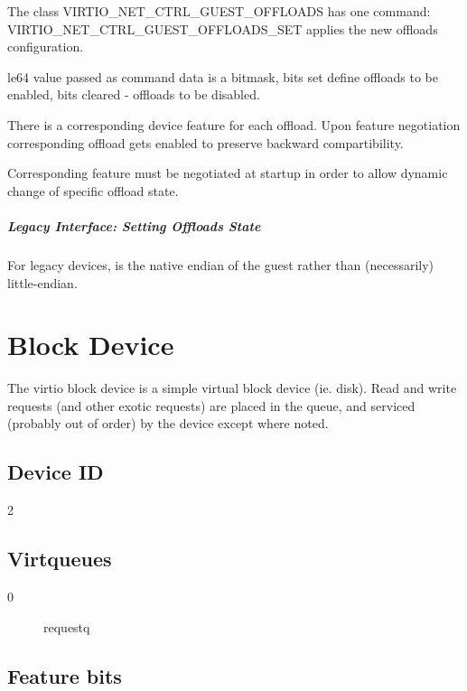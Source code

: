 The class VIRTIO_NET_CTRL_GUEST_OFFLOADS has one command:
VIRTIO_NET_CTRL_GUEST_OFFLOADS_SET applies the new offloads configuration.

le64 value passed as command data is a bitmask, bits set define
offloads to be enabled, bits cleared - offloads to be disabled.

There is a corresponding device feature for each offload. Upon feature
negotiation corresponding offload gets enabled to preserve backward
compartibility.

Corresponding feature must be negotiated at startup in order to allow dynamic
change of specific offload state.


\subparagraph{Legacy Interface: Setting Offloads State}\label{sec:Device Types / Network Device / Device Operation / Control Virtqueue / Offloads State Configuration / Setting Offloads State / Legacy Interface: Setting Offloads State}
For legacy devices,  is the
native endian of the guest rather than (necessarily) little-endian.


\section{Block Device}\label{sec:Device Types / Block Device}

The virtio block device is a simple virtual block device (ie.
disk). Read and write requests (and other exotic requests) are
placed in the queue, and serviced (probably out of order) by the
device except where noted.

\subsection{Device ID}\label{sec:Device Types / Block Device / Device ID}
  2

\subsection{Virtqueues}\label{sec:Device Types / Block Device / Virtqueues}
\begin{description}
\item[0] requestq
\end{description}

\subsection{Feature bits}\label{sec:Device Types / Block Device / Feature bits}

